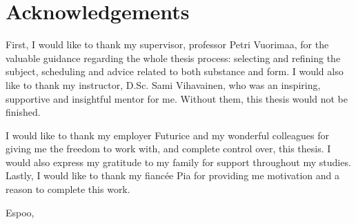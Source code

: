 
\chapter*{Acknowledgements}

First, I would like to thank my supervisor, professor Petri Vuorimaa, for the valuable guidance regarding the whole thesis process: selecting and refining the subject, scheduling and advice related to both substance and form. I would also like to thank my instructor, D.Sc. Sami Vihavainen, who was an inspiring, supportive and insightful mentor for me. Without them, this thesis would not be finished.

I would like to thank my employer Futurice and my wonderful colleagues for giving me the freedom to work with, and complete control over, this thesis. I would also express my gratitude to my family for support throughout my studies. Lastly, I would like to thank my fiancée Pia for providing me motivation and a reason to complete this work.

\vskip 10mm

\noindent Espoo, \DATE
\vskip 5mm
\noindent\AUTHOR
